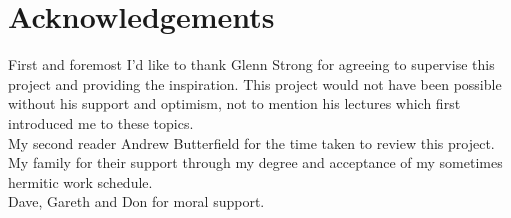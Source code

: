 \section*{Acknowledgements}
First and foremost I'd like to thank Glenn Strong for agreeing
to supervise this project and providing the inspiration. This
project would not have been possible without his support and
optimism, not to mention his lectures which first introduced
me to these topics. \\ 

\noindent My second reader Andrew Butterfield for the time taken to review
this project. \\

\noindent My family for their support through my degree and acceptance of
my sometimes hermitic work schedule. \\

\noindent Dave, Gareth and Don for moral support. 



